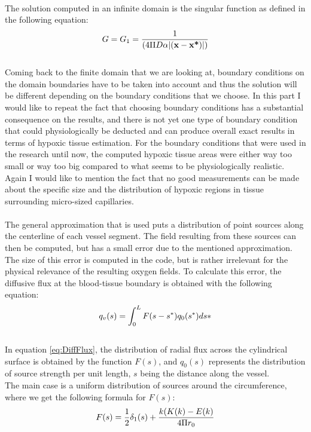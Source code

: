 %
\\The solution computed in an infinite domain is the singular function as defined in the following equation:
\begin{equation}
\\G = G_1 = \frac{1}{(4 \Pi D \alpha |( \textbf{x} - \textbf{x*} )|)}
\label{eq:InfDomainSol}
\end{equation}
%
\\Coming back to the finite domain that we are looking at, boundary conditions on the domain boundaries have to be taken into account and thus the solution will be different depending on the boundary conditions that we choose. In this part I would like to repeat the fact that choosing boundary conditions has a substantial consequence on the results, and there is not yet one type of boundary condition that could physiologically be deducted and can produce overall exact results in terms of hypoxic tissue estimation. For the boundary conditions that were used in the research until now, the computed hypoxic tissue areas were either way too small or way too big compared to what seems to be physiologically realistic. Again I would like to mention the fact that no good measurements can be made about the specific size and the distribution of hypoxic regions in tissue surrounding micro-sized capillaries.\\
\\The general approximation that is used puts a distribution of point sources along the centerline of each vessel segment. The field resulting from these sources can then be computed, but has a small error due to the mentioned approximation. The size of this error is computed in the code, but is rather irrelevant for the physical relevance of the resulting oxygen fields. To calculate this error, the diffusive flux at the blood-tissue boundary is obtained with the following equation:
%
\begin{equation}
\\q_v(s) = \int_{0}^L F(s-s^*)q_0(s^*)ds*
\label{eq:DiffFlux}
\end{equation}
%
\\In equation \ref{eq:DiffFlux}, the distribution of radial flux across the cylindrical surface is obtained by the function $F(s)$, and $q_0(s)$ represents the distribution of source strength per unit length, $s$ being the distance along the vessel.
\\The main case is a uniform distribution of sources around the circumference, where we get the following formula for $F(s)$:
%
\begin{equation}
\\F(s) = \frac{1}{2} \delta_1 (s) + \frac{k (K(k) - E(k)}{4 \Pi r_0}
\label{eq:DiffFluxUni}
\end{equation}
